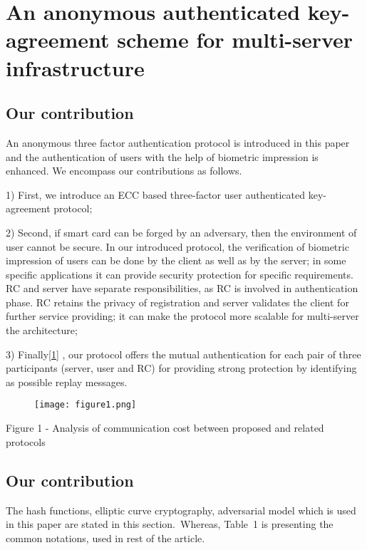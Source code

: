 \documentclass[preprint]{oscmjournal}
\begin{document}
\section{An anonymous authenticated key-agreement scheme for multi-server infrastructure}

\subsection{Our contribution}

An anonymous three factor authentication protocol is introduced in this paper and the authentication of users with the help of biometric impression is enhanced. We encompass our contributions as follows.

1) First, we introduce an ECC based three-factor user authenticated key-agreement protocol;

2) Second, if smart card can be forged by an adversary, then the environment of user cannot be secure. In our introduced protocol, the verification of biometric impression of users can be done by the client as well as by the server; in some specific applications it can provide security protection for specific requirements. RC and server have separate responsibilities, as RC is involved in authentication phase. RC retains the privacy of registration and server validates the client for further service providing; it can make the protocol more scalable for multi-server the architecture;

3) Finally\href{Figure 1 - Analysis of communication cost between proposed and related protocols}{[1]} , our protocol offers the mutual authentication for each pair of three participants (server, user and RC) for providing strong protection by identifying as possible replay messages.

\begin{figure}[H]
    \centering
    \texttt{[image: figure1.png]}

    \label{Figure 1 - Analysis of communication cost between proposed and related protocols}
\end{figure}

Figure 1 - Analysis of communication cost between proposed and related protocols

\subsection{Our contribution}

The hash functions, elliptic curve cryptography, adversarial model which is used in this paper are stated in this section. Whereas, Table 1 is presenting the common notations, used in rest of the article.
\end{document}
